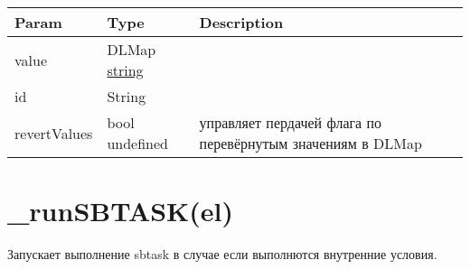 \begin{longtable}[]{@{}lll@{}}
\toprule
\begin{minipage}[b]{0.30\columnwidth}\raggedright
Param\strut
\end{minipage} & \begin{minipage}[b]{0.30\columnwidth}\raggedright
Type\strut
\end{minipage} & \begin{minipage}[b]{0.30\columnwidth}\raggedright
Description\strut
\end{minipage}\tabularnewline
\midrule
\endhead
\begin{minipage}[t]{0.30\columnwidth}\raggedright
value\strut
\end{minipage} & \begin{minipage}[t]{0.30\columnwidth}\raggedright
DLMap \textbar{} \protect\hyperlink{string}{string}\strut
\end{minipage} & \begin{minipage}[t]{0.30\columnwidth}\raggedright
\strut
\end{minipage}\tabularnewline
\begin{minipage}[t]{0.30\columnwidth}\raggedright
id\strut
\end{minipage} & \begin{minipage}[t]{0.30\columnwidth}\raggedright
String\strut
\end{minipage} & \begin{minipage}[t]{0.30\columnwidth}\raggedright
\strut
\end{minipage}\tabularnewline
\begin{minipage}[t]{0.30\columnwidth}\raggedright
revertValues\strut
\end{minipage} & \begin{minipage}[t]{0.30\columnwidth}\raggedright
bool \textbar{} undefined\strut
\end{minipage} & \begin{minipage}[t]{0.30\columnwidth}\raggedright
управляет пердачей флага по перевёрнутым значениям в DLMap\strut
\end{minipage}\tabularnewline
\bottomrule
\end{longtable}

\hypertarget{runsbtaskel}{%
\section{\_runSBTASK(el)}\label{runsbtaskel}}

Запускает выполнение sbtask в случае если выполнются внутренние условия.


